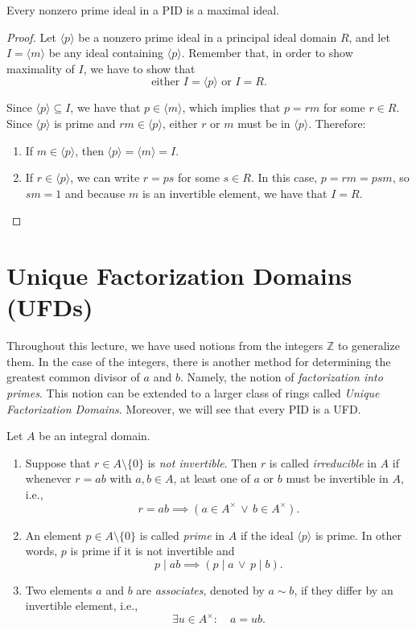 \documentclass[11pt,a4paper]{article}
\begin{document}
\begin{prop}[10.2]
Every nonzero prime ideal in a PID is a maximal ideal.
\end{prop}

\begin{proof}
Let $\langle p \rangle$ be a nonzero prime ideal in a principal ideal domain $R$, and let $I = \langle m \rangle$ be any ideal containing $\langle p \rangle$. Remember that, in order to show maximality of $I$, we have to show that
\[
\text{either } I = \langle p \rangle \text{ or } I = R.
\]

Since $\langle p \rangle \subseteq I$, we have that $p \in \langle m \rangle$, which implies that $p = rm$ for some $r \in R$. Since $\langle p \rangle$ is prime and $rm \in \langle p \rangle$, either $r$ or $m$ must be in $\langle p \rangle$. Therefore:
\begin{enumerate}[label=(\roman*)]
    \item If $m \in \langle p \rangle$, then $\langle p \rangle = \langle m \rangle = I$.
    \item If $r \in \langle p \rangle$, we can write $r = ps$ for some $s \in R$. In this case, $p = rm = psm$, so $sm = 1$ and because $m$ is an invertible element, we have that $I = R$.
\end{enumerate}
\end{proof}


\section{Unique Factorization Domains (UFDs)}

Throughout this lecture, we have used notions from the integers $\mathbb{Z}$ to generalize them. In the case of the integers, there is another method for determining the greatest common divisor of $a$ and $b$. Namely, the notion of \textit{factorization into primes}. This notion can be extended to a larger class of rings called \textit{Unique Factorization Domains}. Moreover, we will see that every PID is a UFD.

Let $A$ be an integral domain.
\begin{enumerate}[label=(\roman*)]
    \item Suppose that $r \in A \setminus \{0\}$ is \textit{not invertible}. Then $r$ is called \textit{irreducible} in $A$ if whenever $r = ab$ with $a, b \in A$, at least one of $a$ or $b$ must be invertible in $A$, i.e.,
    \[
    r = ab \implies \left(a \in A^\times \, \lor \, b \in A^\times\right).
    \]

    \item An element $p \in A \setminus \{0\}$ is called \textit{prime} in $A$ if the ideal $\langle p \rangle$ is prime. In other words, $p$ is prime if it is not invertible and
    \[
    p \mid ab \implies \left(p \mid a \, \lor \, p \mid b\right).
    \]

    \item Two elements $a$ and $b$ are \textit{associates}, denoted by $a \sim b$, if they differ by an invertible element, i.e.,
    \[
    \exists u \in A^\times : \quad a = ub.
    \]
\end{enumerate}
\end{document}
